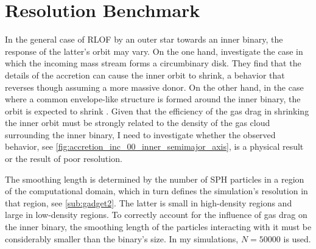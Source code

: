 \section{Resolution Benchmark}\label{sec:resolution}

In the general case of RLOF by an outer star towards an inner binary, the response of the latter's orbit may vary. On the one hand, \cite{zwart2019triple} investigate the case in which the incoming mass stream forms a circumbinary disk. They find that the details of the accretion can cause the inner orbit to shrink, a behavior that reverses though assuming a more massive donor. On the other hand, in the case where a common envelope-like structure is formed around the inner binary, the orbit is expected to shrink \citep{de2014evolution}. Given that the efficiency of the gas drag in shrinking the inner orbit must be strongly related to the density of the gas cloud surrounding the inner binary, I need to investigate whether the observed behavior, see \cref{fig:accretion_inc_00_inner_semimajor_axis}, is a physical result or the result of poor resolution.

The smoothing length is determined by the number of SPH particles in a region of the computational domain, which in turn defines the simulation's resolution in that region, see \cref{sub:gadget2}. The latter is small in high-density regions and large in low-density regions. To correctly account for the influence of gas drag on the inner binary, the smoothing length of the particles interacting with it must be considerably smaller than the binary's size. In my simulations, $N=50000$ is used. 

